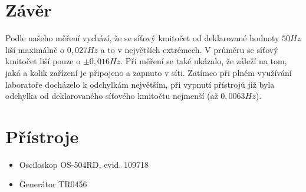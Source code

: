 \documentclass[12pt]{article} %
\begin{document}
\section{Závěr}
Podle našeho měření vychází, že se síťový kmitočet od deklarované hodnoty $50Hz$ liší maximálně o $0,027Hz$ a to v největších extrémech. V průměru se síťový kmitočet liší pouze o $\pm 0,016Hz$. Při měření se také ukázalo, že záleží na tom, jaká a kolik zařízení je připojeno a zapnuto v síti. Zatímco při plném využívání laboratoře docházelo k odchylkám největším, při vypnutí přístrojů již byla odchylka od deklarovaného síťového kmitočtu nejmenší (až $0,0063Hz$).

\section{Přístroje}
\begin{itemize}
\item Osciloskop OS-504RD, evid. 109718
\item Generátor TR0456
\end{itemize}
\end{document}
